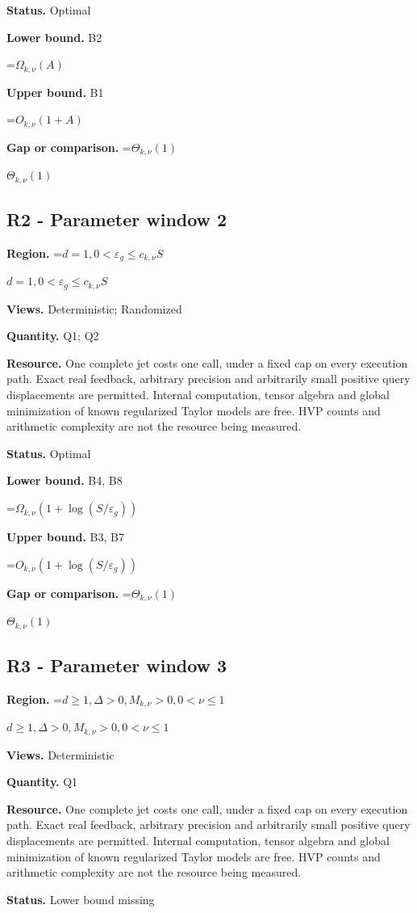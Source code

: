 \documentclass[10pt,a4paper]{article}
\newcommand{\AtlasMath}[1]{\par\begingroup\centering\setbox0=\hbox{$\displaystyle #1$}\ifdim\wd0>1.4\linewidth\typeout{ATLAS WIDE FORMULA: \the\wd0}\fi\ifdim\wd0>\linewidth\resizebox{\linewidth}{!}{\box0}\else\box0\fi\par\endgroup}
\newcommand{\AtlasInlineMath}[1]{\begingroup\setbox0=\hbox{$#1$}\ifdim\wd0>.4\linewidth\endgroup\AtlasMath{#1}\else\endgroup$#1$\fi}
\begin{document}
\textbf{Status.} Optimal

\textbf{Lower bound.} B2

\AtlasMath{\Omega_{k,\nu}(A)}
\textbf{Upper bound.} B1

\AtlasMath{O_{k,\nu}(1+A)}
\textbf{Gap or comparison.} \AtlasInlineMath{\Theta_{k,\nu}(1)}

\subsection{R2 - Parameter window 2}
\textbf{Region.} \AtlasInlineMath{d=1,0<\varepsilon_g\le c_{k,\nu}S}

\textbf{Views.} Deterministic; Randomized

\textbf{Quantity.} Q1; Q2

\textbf{Resource.} One complete jet costs one call, under a fixed cap on every execution path. Exact real feedback, arbitrary precision and arbitrarily small positive query displacements are permitted. Internal computation, tensor algebra and global minimization of known regularized Taylor models are free. HVP counts and arithmetic complexity are not the resource being measured.

\textbf{Status.} Optimal

\textbf{Lower bound.} B4, B8

\AtlasMath{\Omega_{k,\nu}(1+\log(S/\varepsilon_g))}
\textbf{Upper bound.} B3, B7

\AtlasMath{O_{k,\nu}(1+\log(S/\varepsilon_g))}
\textbf{Gap or comparison.} \AtlasInlineMath{\Theta_{k,\nu}(1)}

\subsection{R3 - Parameter window 3}
\textbf{Region.} \AtlasInlineMath{d\ge 1,\Delta>0,M_{k,\nu}>0,0<\nu\le 1}

\textbf{Views.} Deterministic

\textbf{Quantity.} Q1

\textbf{Resource.} One complete jet costs one call, under a fixed cap on every execution path. Exact real feedback, arbitrary precision and arbitrarily small positive query displacements are permitted. Internal computation, tensor algebra and global minimization of known regularized Taylor models are free. HVP counts and arithmetic complexity are not the resource being measured.

\textbf{Status.} Lower bound missing
\end{document}

